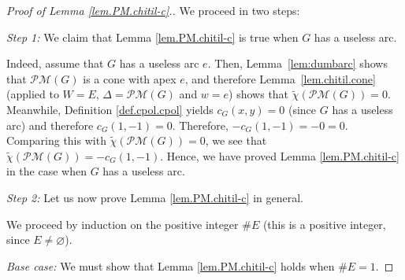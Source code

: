 \documentclass[12pt]{amsart}
\theoremstyle{definition}
\newcommand{\Pm}[1]{\mathcal{PM}\left(#1\right)}
\begin{document}
\begin{proof}[Proof of Lemma \ref{lem.PM.chitil-c}.]
We proceed in two steps:

\textit{Step 1:} We claim that Lemma \ref{lem.PM.chitil-c} is true when $G$
has a useless arc.

Indeed, assume that $G$ has a useless arc $e$. Then, Lemma~\ref{lem:dumbarc}
shows that $\Pm{G}$ is a cone with apex $e$, and therefore
Lemma~\ref{lem.chitil.cone} (applied to $W=E$, $\Delta=\Pm{G}$ and
$w=e$) shows that $\widetilde{\chi}\left(  \Pm{G}\right)  =0$.
Meanwhile, Definition \ref{def.cpol.cpol} yields $c_{G}\left(  x,y\right)  =0$
(since $G$ has a useless arc) and therefore $c_{G}\left(  1,-1\right)  =0$.
Therefore, $-c_{G}\left(  1,-1\right)  =-0=0$. Comparing this with
$\widetilde{\chi}\left(  \Pm{G}\right)  =0$, we see that
$\widetilde{\chi}\left(  \Pm{G}\right)  =-c_{G}\left(
1,-1\right)  $. Hence, we have proved Lemma \ref{lem.PM.chitil-c} in the case
when $G$ has a useless arc.

\textit{Step 2:} Let us now prove Lemma \ref{lem.PM.chitil-c} in general.

We proceed by induction on the positive integer $\#E$ (this is a positive
integer, since $E\neq\varnothing$).

\textit{Base case:} We must show that Lemma \ref{lem.PM.chitil-c} holds when
$\#E=1$.


\end{proof}
\end{document}

